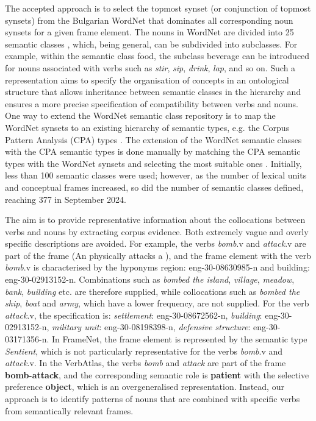 \documentclass[output=paper,colorlinks,citecolor=brown]{langscibook}
\begin{document}
The accepted approach is to select the topmost synset (or conjunction of topmost synsets) from the Bulgarian WordNet that dominates all corresponding noun synsets for a given frame element. The nouns in WordNet are divided into 25 semantic classes \citep[16]{Miller1990}, which, being general, can be subdivided into subclasses. For example, within the semantic class {food}, the subclass {beverage} can be introduced for nouns associated with verbs such as \textit{stir}, \textit{sip}, \textit{drink}, \textit{lap}, and so on. Such a representation aims to specify the organisation of concepts in an ontological structure that allows inheritance between semantic classes in the hierarchy and ensures a more precise specification of compatibility between verbs and nouns. One way to extend the WordNet semantic class repository is to map the WordNet synsets to an existing hierarchy of semantic types, e.g. the Corpus Pattern Analysis (CPA) types \citep{hanks2004}. The extension of the WordNet semantic classes with the CPA semantic types is done manually by matching the CPA semantic types with the WordNet synsets and selecting the most suitable ones \citep{koeva-etal-2018-mapping}. Initially, less than 100 semantic classes were used; however, as the number of lexical units and conceptual frames increased, so did the number of semantic classes defined, reaching 377 in September 2024.

The aim is to provide representative information about the collocations between verbs and nouns by extracting corpus evidence. Both extremely vague and overly specific descriptions are avoided. For example, the verbs \textit{bomb}.v and \textit{attack}.v are part of the frame  (An  physically attacks a ), and the frame element  with the verb \textit{bomb}.v is characterised by the hyponyms {region}: eng-30-08630985-n and {building}: eng-30-02913152-n. Combinations such as \textit{bombed the island}, \textit{village}, \textit{meadow}, \textit{bank}, \textit{building} etc. are therefore supplied, while collocations such as \textit{bombed the ship}, \textit{boat} and \textit{army}, which have a lower frequency, are not supplied. For the verb \textit{attack}.v, the specification is: {\textit{settlement}}: eng-30-08672562-n, {\textit{building}}: eng-30-02913152-n, {\textit{military unit}}: eng-30-08198398-n, {\textit{defensive structure}}: eng-30-03171356-n. In FrameNet, the frame element  is represented by the semantic type \emph{Sentient}, which is not particularly representative for the verbs \textit{bomb}.v and \textit{attack}.v. In the VerbAtlas, the verbs \textit{bomb} and \textit{attack} are part of the frame \textbf{bomb-attack}, and the corresponding semantic role is \textbf{patient} with the selective preference \textbf{object}, which is an overgeneralised representation. Instead, our approach is to identify patterns of nouns that are combined with specific verbs from semantically relevant frames.
\end{document}
